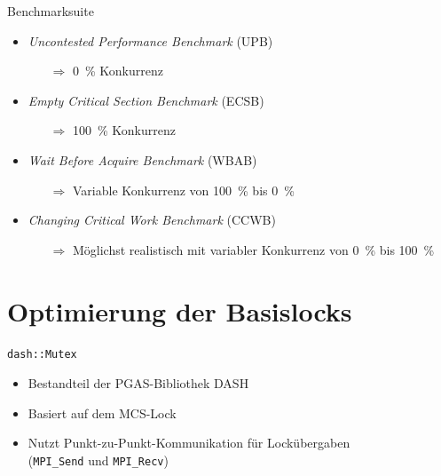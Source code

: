 \documentclass[fleqn,compress,utf8,aspectratio=169,t]{beamer}
\begin{document}
\begin{frame}{Benchmarksuite}
    \begin{itemize}
        \item \textit{Uncontested Performance Benchmark} (UPB)
              \begin{itemize}
                  \item[$\Rightarrow$] 0~\% Konkurrenz
              \end{itemize}
        \item \textit{Empty Critical Section Benchmark} (ECSB)
              \begin{itemize}
                  \item[$\Rightarrow$] 100~\% Konkurrenz
              \end{itemize}
        \item \textit{Wait Before Acquire Benchmark} (WBAB)
              \begin{itemize}
                  \item[$\Rightarrow$] Variable Konkurrenz von 100~\% bis 0~\%
              \end{itemize}
        \item \textit{Changing Critical Work Benchmark} (CCWB)
              \begin{itemize}
                  \item[$\Rightarrow$] Möglichst realistisch mit variabler Konkurrenz von 0~\% bis 100~\%
              \end{itemize}
    \end{itemize}
\end{frame}

\section{Optimierung der Basislocks}

\begin{frame}{\texttt{dash::Mutex}}
    \begin{itemize}
        \item Bestandteil der PGAS-Bibliothek DASH \cite{DART-MPI}
        \item Basiert auf dem MCS-Lock \cite{MCS-Lock}
        \item Nutzt Punkt-zu-Punkt-Kommunikation für Lockübergaben\\(\texttt{MPI\_Send} und \texttt{MPI\_Recv})
    \end{itemize}
\end{frame}
\end{document}
